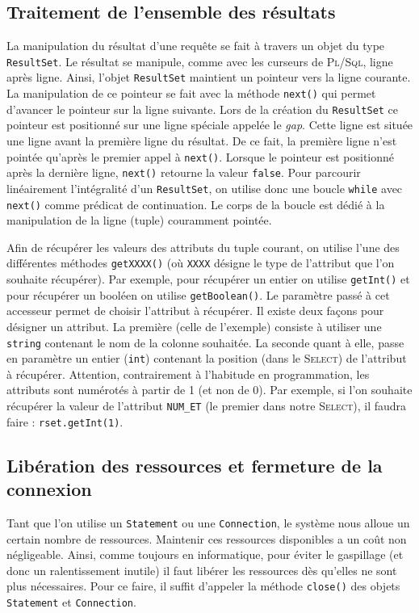 \documentclass{article}
\begin{document}
\subsection{Traitement de l'ensemble des résultats}
La manipulation du résultat d'une requête se fait à travers un objet du type \texttt{ResultSet}. Le résultat se manipule, comme avec les curseurs de \textsc{Pl/Sql}, ligne après ligne. Ainsi, l'objet \texttt{ResultSet} maintient un pointeur vers la ligne courante. La manipulation de ce pointeur se fait avec la méthode \texttt{next()} qui permet d'avancer le pointeur sur la ligne suivante. Lors de la création du \texttt{ResultSet} ce pointeur est positionné sur une ligne spéciale appelée le \emph{gap}. Cette ligne est située une ligne avant la première ligne du résultat. De ce fait, la première ligne n'est pointée  qu'après le premier appel à \texttt{next()}. Lorsque le pointeur est positionné après la dernière ligne, \texttt{next()} retourne la valeur \texttt{false}. Pour parcourir linéairement l'intégralité d'un \texttt{ResultSet}, on utilise donc une boucle \texttt{while} avec \texttt{next()} comme prédicat de continuation. Le corps de la boucle est dédié à la manipulation de la ligne (tuple) couramment pointée.

Afin de récupérer les valeurs des attributs du tuple courant, on utilise l'une des différentes méthodes \texttt{getXXXX()} (où \texttt{XXXX} désigne le type de l'attribut que l'on souhaite récupérer). Par exemple, pour récupérer un entier on utilise \texttt{getInt()} et pour récupérer un booléen on utilise \texttt{getBoolean()}. Le paramètre passé à cet accesseur permet de choisir l'attribut à récupérer. Il existe deux façons pour désigner un attribut. La première (celle de l'exemple) consiste à utiliser une \texttt{string} contenant le nom de la colonne souhaitée. La seconde quant à elle, passe en paramètre un entier (\texttt{int}) contenant la position (dans le \textsc{Select}) de l'attribut à récupérer. Attention, contrairement à l'habitude en programmation, les attributs sont numérotés à partir de 1 (et non de 0). Par exemple, si l'on souhaite récupérer la valeur de l'attribut \texttt{NUM\_ET} (le premier dans notre \textsc{Select}), il faudra faire : \texttt{rset.getInt(1)}.

\subsection{Libération des ressources et fermeture de la connexion}
Tant que l'on utilise un \texttt{Statement} ou une \texttt{Connection}, le système nous alloue un certain nombre de ressources. Maintenir ces ressources disponibles a un coût non négligeable. Ainsi, comme toujours en informatique, pour éviter le gaspillage (et donc un ralentissement inutile) il faut libérer les ressources dès qu'elles ne sont plus nécessaires. Pour ce faire, il suffit d'appeler la méthode \texttt{close()} des objets \texttt{Statement} et \texttt{Connection}.
\end{document}
